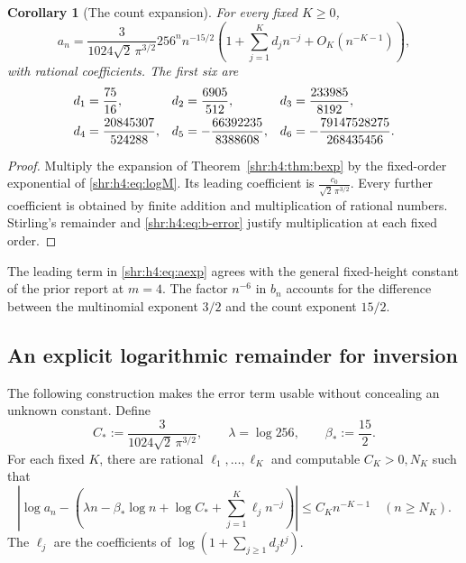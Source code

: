 \documentclass[11pt,letterpaper]{article}
\numberwithin{equation}{section}
\newtheorem{corollary}[theorem]{Corollary}
\theoremstyle{definition}
\newcommand{\1}{\mathbf 1}
\begin{document}
\begin{corollary}[The count expansion]
\label{shr:h4:cor:aexp}
For every fixed $K\ge0$,
\begin{equation}
 a_n=\frac{3}{1024\sqrt2\,\pi^{3/2}}
       256^n n^{-15/2}
       \left(1+\sum_{j=1}^K d_jn^{-j}+O_K(n^{-K-1})\right),
 \label{shr:h4:eq:aexp}
\end{equation}
with rational coefficients. The first six are
\begin{align}
 d_1&=\frac{75}{16},&d_2&=\frac{6905}{512},&
 d_3&=\frac{233985}{8192},\notag\\
 d_4&=\frac{20845307}{524288},&
 d_5&=-\frac{66392235}{8388608},&
 d_6&=-\frac{79147528275}{268435456}.
 \label{shr:h4:eq:dvalues}
\end{align}
\end{corollary}
\begin{proof}
Multiply the expansion of Theorem~\ref{shr:h4:thm:bexp} by the fixed-order
exponential of \eqref{shr:h4:eq:logM}. Its leading coefficient is
$\frac{c_0}{\sqrt2\,\pi^{3/2}}$. Every further coefficient is obtained by finite
addition and multiplication of rational numbers. Stirling's remainder
and \eqref{shr:h4:eq:b-error} justify multiplication at each fixed order.
\end{proof}

The leading term in \eqref{shr:h4:eq:aexp} agrees with the general fixed-height
constant of the prior report at $m=4$. The factor $n^{-6}$ in $b_n$
accounts for the difference between the multinomial exponent $3/2$ and
the count exponent $15/2$.

\subsection{An explicit logarithmic remainder for inversion}
The following construction makes the error term usable without concealing
an unknown constant. Define
\begin{equation}
 C_*:=\frac{3}{1024\sqrt2\,\pi^{3/2}},\qquad
 \lambda=\log256,\qquad \beta_*:=\frac{15}2.
 \label{shr:h4:eq:Cstar}
\end{equation}
For each fixed $K$, there are rational $\ell_1,\ldots,\ell_K$ and
computable $C_K>0,N_K$ such that
\begin{equation}
 \left|\log a_n-\left(\lambda n-\beta_*\log n+\log C_*
                   +\sum_{j=1}^K\ell_jn^{-j}\right)\right|
 \le C_Kn^{-K-1}\quad(n\ge N_K).
 \label{shr:h4:eq:logerror}
\end{equation}
The $\ell_j$ are the coefficients of
$\log(1+\sum_{j\ge1}d_jt^j)$.
\end{document}
